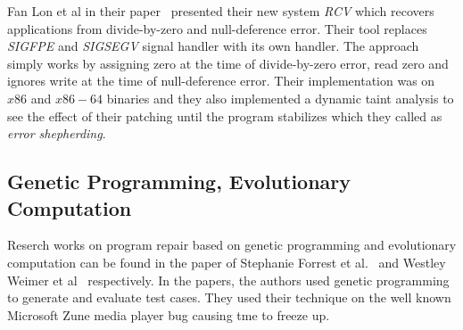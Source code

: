 Fan Lon et al in their paper~\cite{conf/pldi/LongSR14} presented their new
system \emph{RCV} which recovers applications from divide-by-zero and
null-deference error. Their tool replaces \emph{SIGFPE} and \emph{SIGSEGV}
signal handler with its own handler. The approach simply works by assigning
zero at the time of divide-by-zero error, read zero and ignores write at the
time
of null-deference error. Their implementation was on $x86$ and $x86-64$
binaries and they also implemented a dynamic taint analysis to see the effect of
their
patching until the program stabilizes which they called as \emph{error
shepherding}.

\subsection{Genetic Programming, Evolutionary Computation}
\label{subsec:RecWorksGeneric}

Reserch works on program repair based on genetic programming and evolutionary
computation can be found in the paper of Stephanie Forrest et
al.~\cite{conf/gecco/2009g} and Westley Weimer et
al~\cite{journals/cacm/WeimerFGN10} respectively. In the papers, the
authors used genetic programming to generate and evaluate test cases. They used
their technique on the well known Microsoft Zune media player bug causing tme
to freeze up.


